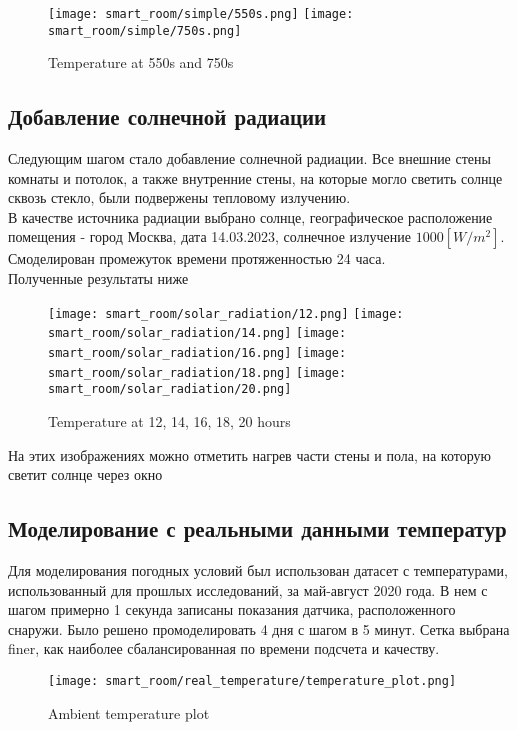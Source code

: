 \begin{figure}[H]
\texttt{[image: smart\_room/simple/550s.png]}\hfill
\texttt{[image: smart\_room/simple/750s.png]}
\caption{Temperature at 550s and 750s}
\end{figure}

\newpage


\subsection{Добавление солнечной радиации}

Следующим шагом стало добавление солнечной радиации.
Все внешние стены комнаты и потолок, а также внутренние стены, на которые могло светить солнце сквозь стекло, были подвержены тепловому излучению.\\
В качестве источника радиации выбрано солнце, географическое расположение помещения - город Москва, дата 14.03.2023, солнечное излучение $1000[W/m^2]$.
Смоделирован промежуток времени протяженностью 24 часа.\\
Полученные результаты ниже

\begin{figure}[H]
\texttt{[image: smart\_room/solar\_radiation/12.png]}\hfill
\texttt{[image: smart\_room/solar\_radiation/14.png]}\hfill
\texttt{[image: smart\_room/solar\_radiation/16.png]}\hfill
\texttt{[image: smart\_room/solar\_radiation/18.png]}\hfill
\texttt{[image: smart\_room/solar\_radiation/20.png]}
\caption{Temperature at 12, 14, 16, 18, 20 hours}
\end{figure}

На этих изображениях можно отметить нагрев части стены и пола, на которую светит солнце через окно

\newpage


\subsection{Моделирование с реальными данными температур}

Для моделирования погодных условий был использован датасет с температурами, использованный для прошлых исследований, за май-август 2020 года. В нем с шагом примерно 1 секунда записаны показания датчика, расположенного снаружи. Было решено промоделировать 4 дня с шагом в 5 минут. Сетка выбрана finer, как наиболее сбалансированная по времени подсчета и качеству.

\begin{figure}[H]
\texttt{[image: smart\_room/real\_temperature/temperature\_plot.png]}
\caption{Ambient temperature plot}
\end{figure}





































